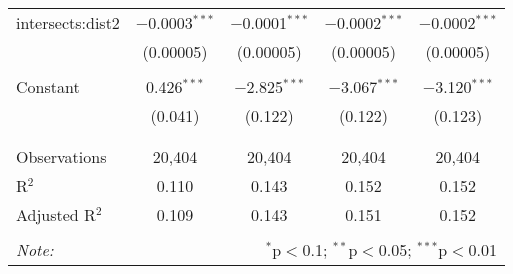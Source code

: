 \begin{table}[!htbp]
\begin{tabular}{@{\extracolsep{-5pt}}lcccc}
 intersects:dist2 & $-$0.0003$^{***}$ & $-$0.0001$^{***}$ & $-$0.0002$^{***}$ & $-$0.0002$^{***}$ \\ 
  & (0.00005) & (0.00005) & (0.00005) & (0.00005) \\ 
  & & & & \\ 
 Constant & 0.426$^{***}$ & $-$2.825$^{***}$ & $-$3.067$^{***}$ & $-$3.120$^{***}$ \\ 
  & (0.041) & (0.122) & (0.122) & (0.123) \\ 
  & & & & \\ 
\hline \\[-1.8ex] 
Observations & 20,404 & 20,404 & 20,404 & 20,404 \\ 
R$^{2}$ & 0.110 & 0.143 & 0.152 & 0.152 \\ 
Adjusted R$^{2}$ & 0.109 & 0.143 & 0.151 & 0.152 \\ 
\hline 
\hline \\[-1.8ex] 
\textit{Note:}  & \multicolumn{4}{r}{$^{*}$p$<$0.1; $^{**}$p$<$0.05; $^{***}$p$<$0.01} \\ 
\end{tabular} 
\end{table} 
